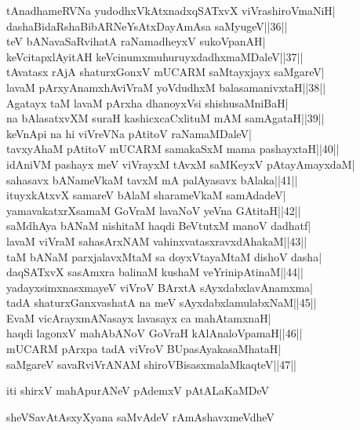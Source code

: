 \documentclass{article}
\begin{document}
tAnadhameRVNa yudodhxVkAtxnadxqSATxvX viVrashiroVmaNiH|\\
dashaBidaRshaBibARNeYsAtxDayAmAsa saMyugeV||36||\\
teV bANavaSaRvihatA raNamadheyxV sukoVpanAH|\\
keVcitapxlAyitAH keVcinumxmuhuruyxdadhxmaMDaleV||37||\\
tAvatasx rAjA shaturxGonxV mUCARM saMtayxjayx saMgareV|\\
lavaM pArxyAnamxhAviVraM yoVdudhxM balasamanivxtaH||38||\\
Agatayx taM lavaM pArxha dhanoyxVsi shishusaMniBaH|\\
na bAlasatxvXM suraH kashicxcaCxlituM mAM samAgataH||39||\\
keVnApi na hi viVreVNa pAtitoV raNamaMDaleV|\\
tavxyAhaM pAtitoV mUCARM samakaSxM mama pashayxtaH||40||\\
idAniVM pashayx meV viVrayxM tAvxM saMKeyxV pAtayAmayxdaM|\\
sahasavx bANameVkaM tavxM mA palAyasavx bAlaka||41||\\
ituyxkAtxvX samareV bAlaM sharameVkaM samAdadeV|\\
yamavakatxrXsamaM GoVraM lavaNoV yeVna GAtitaH||42||\\
saMdhAya bANaM nishitaM haqdi BeVtutxM manoV dadhatf|\\
lavaM viVraM sahasArxNAM vahinxvatasxravxdAhakaM||43||\\
taM bANaM parxjalavxMtaM sa doyxVtayaMtaM dishoV dasha|\\
daqSATxvX sasAmxra balinaM kushaM veYrinipAtinaM||44||\\
yadayxsimxnasxmayeV viVroV BArxtA sAyxdabxlavAnamxma|\\
tadA shaturxGanxvashatA na meV sAyxdabxlamulabxNaM||45||\\
EvaM vicArayxmANasayx lavasayx ca mahAtamxnaH|\\
haqdi lagonxV mahAbANoV GoVraH kAlAnaloVpamaH||46||\\
mUCARM pArxpa tadA viVroV BUpasAyakasaMhataH|\\
saMgareV savaRviVrANAM shiroVBisasxmalaMkaqteV||47||\\

\begin{center}
iti shirxV mahApurANeV pAdemxV pAtALaKaMDeV
\end{center}

\begin{center}
sheVSavAtAsxyXyana saMvAdeV rAmAshavxmeVdheV
\end{center}
\end{document}
